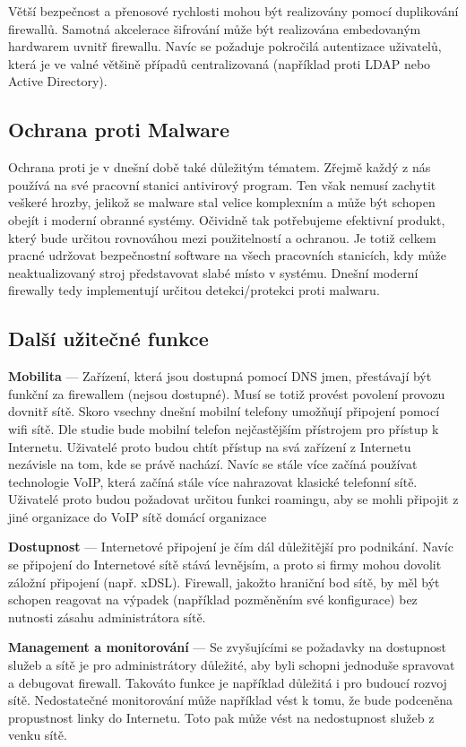 \documentclass[11pt,a4paper]{article}
\begin{document}
Větší bezpečnost a přenosové rychlosti mohou být realizovány pomocí duplikování firewallů. Samotná akcelerace šifrování může být realizována embedovaným hardwarem uvnitř firewallu. Navíc se požaduje pokročilá autentizace uživatelů, která je ve valné většině případů centralizovaná (například proti LDAP nebo Active Directory).

\subsection{Ochrana proti Malware}
Ochrana proti je v dnešní době také důležitým tématem. Zřejmě každý z nás používá na své pracovní stanici antivirový program. Ten však nemusí zachytit veškeré hrozby, jelikož se malware stal velice komplexním a může být schopen obejít i moderní obranné systémy. Očividně tak potřebujeme efektivní produkt, který bude určitou rovnováhou mezi použitelností a ochranou. Je totiž celkem pracné udržovat bezpečnostní software na všech pracovních stanicích, kdy může neaktualizovaný stroj představovat slabé místo v systému. Dnešní moderní firewally tedy implementují určitou detekci/protekci proti malwaru.

\subsection{Další užitečné funkce}
\textbf{Mobilita} --- Zařízení, která jsou dostupná pomocí DNS jmen, přestávají být funkční za firewallem (nejsou dostupné). Musí se totiž provést povolení provozu dovnitř sítě. Skoro vsechny dnešní mobilní telefony umožňují připojení pomocí wifi sítě. Dle studie bude mobilní telefon nejčastějším přístrojem pro přístup k Internetu. Uživatelé proto budou chtít přístup na svá zařízení z Internetu nezávisle na tom, kde se právě nachází. Navíc se stále více začíná používat technologie VoIP, která začíná stále více nahrazovat klasické telefonní sítě. Uživatelé proto budou požadovat určitou funkci roamingu, aby se mohli připojit z jiné organizace do VoIP sítě domácí organizace

\textbf{Dostupnost} --- Internetové připojení je čím dál důležitější pro podnikání. Navíc se připojení do Internetové sítě stává levnějsím, a proto si firmy mohou dovolit záložní připojení (např. xDSL). Firewall, jakožto hraniční bod sítě, by měl být schopen reagovat na výpadek (například pozměněním své konfigurace) bez nutnosti zásahu administrátora sítě.

\textbf{Management a monitorování} --- Se zvyšujícími se požadavky na dostupnost služeb a sítě je pro administrátory důležité, aby byli schopni jednoduše spravovat a debugovat firewall. Takováto funkce je například důležitá i pro budoucí rozvoj sítě. Nedostatečné monitorování může například vést k tomu, že bude podceněna propustnost linky do Internetu. Toto pak může vést na nedostupnost služeb z venku sítě. 
\end{document}
